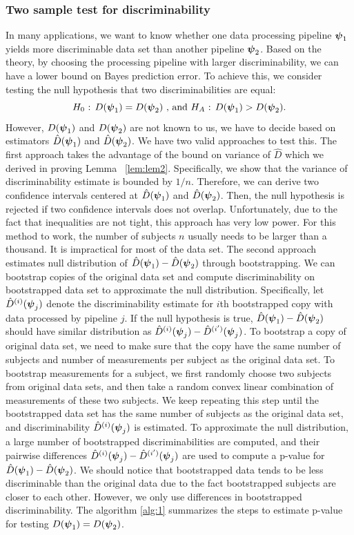 \documentclass{article}
\begin{document}
\subsubsection{Two sample test for discriminability}
In many applications, we want to know whether one data processing pipeline $\boldsymbol{\psi}_1$ yields more discriminable data set than another pipeline $\boldsymbol{\psi}_2$. Based on the theory, by choosing the processing pipeline with larger discriminability, we can have a lower bound on Bayes prediction error. To achieve this, we consider testing the null hypothesis that two discriminabilities are equal:
\[H_0 \text{ : } D(\boldsymbol{\psi}_1) = D(\boldsymbol{\psi}_2) \text{ , and }  H_A \text{ : } D(\boldsymbol{\psi}_1) > D(\boldsymbol{\psi}_2).\] 
However, $D(\boldsymbol{\psi}_1)$ and $D(\boldsymbol{\psi}_2)$ are not known to us, we have to decide based on estimators $\hat{D}(\boldsymbol{\psi}_1)$ and $\hat{D}(\boldsymbol{\psi}_2)$. We have two valid approaches to test this. The first approach takes the advantage of the bound on variance of $\hat{D}$ which we derived in proving Lemma ~\ref{lem:lem2}. Specifically, we show that the variance of discriminability estimate is bounded by $1/n$. Therefore, we can derive two confidence intervals centered at $\hat{D}(\boldsymbol{\psi}_1)$ and $\hat{D}(\boldsymbol{\psi}_2)$. Then, the null hypothesis is rejected if two confidence intervals does not overlap. Unfortunately, due to the fact that inequalities are not tight, this approach has very low power. For this method to work, the number of subjects $n$ usually needs to be larger than a thousand. It is impractical for most of the data set. The second approach estimates null distribution of $\hat{D}(\boldsymbol{\psi}_1) - \hat{D}(\boldsymbol{\psi}_2)$ through bootstrapping. We can bootstrap copies of the original data set and compute discriminability on bootstrapped data set to approximate the null distribution. Specifically, let $\hat{D}^{(i)}(\boldsymbol{\psi}_j)$ denote the discriminability estimate for $i$th bootstrapped copy with data processed by pipeline $j$. If the null hypothesis is true, $\hat{D}(\boldsymbol{\psi}_1) - \hat{D}(\boldsymbol{\psi}_2)$ should have similar distribution as $\hat{D}^{(i)}(\boldsymbol{\psi}_j)-\hat{D}^{(i')}(\boldsymbol{\psi}_j)$. To bootstrap a copy of original data set, we need to make sure that the copy have the same number of subjects and number of measurements per subject as the original data set. To bootstrap measurements for a subject, we first randomly choose two subjects from original data sets, and then take a random convex linear combination of measurements of these two subjects. We keep repeating this step until the bootstrapped data set has the same number of subjects as the original data set, and discriminability $\hat{D}^{(i)}(\boldsymbol{\psi}_j)$ is estimated. To approximate the null distribution, a large number of bootstrapped discriminabilities are computed, and their pairwise differences $\hat{D}^{(i)}(\boldsymbol{\psi}_j)-\hat{D}^{(i')}(\boldsymbol{\psi}_j)$ are used to compute a p-value for $\hat{D}(\boldsymbol{\psi}_1) - \hat{D}(\boldsymbol{\psi}_2)$. We should notice that bootstrapped data tends to be less discriminable than the original data due to the fact bootstrapped subjects are closer to each other. However, we only use differences in bootstrapped discriminability. The algorithm \ref{alg:1} summarizes the steps to estimate p-value for testing $D(\boldsymbol{\psi}_1) = D(\boldsymbol{\psi}_2)$. 
\end{document}
